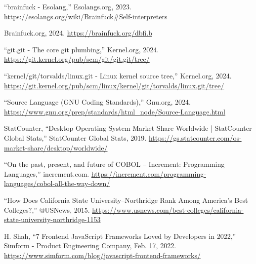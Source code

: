 \documentclass[12pt]{report} %
\begin{document}
\begin{singlespace}
\begin{thebibliography}{}
             “brainfuck - Esolang,” Esolangs.org, 2023. \href{https://esolangs.org/wiki/Brainfuck#Self-interpreters}{https://esolangs.org/wiki/Brainfuck\#Self-interpreters}
            
             Brainfuck.org, 2024. \href{https://brainfuck.org/dbfi.b}{https://brainfuck.org/dbfi.b}
            
             “git.git - The core git plumbing,” Kernel.org, 2024. \href{https://git.kernel.org/pub/scm/git/git.git/tree/}{https://git.kernel.org/pub/scm/git/git.git/tree/}

             “kernel/git/torvalds/linux.git - Linux kernel source tree,” Kernel.org, 2024. \href{https://git.kernel.org/pub/scm/linux/kernel/git/torvalds/linux.git/tree/}{https://git.kernel.org/pub/scm/linux/kernel/git/torvalds/linux.git/tree/}

              “Source Language (GNU Coding Standards),” Gnu.org, 2024. \href{https://www.gnu.org/prep/standards/html_node/Source-Language.html}{https://www.gnu.org/prep/standards/html\_node/Source-Language.html}
            
             StatCounter, “Desktop Operating System Market Share Worldwide | StatCounter Global Stats,” StatCounter Global Stats, 2019. \href{https://gs.statcounter.com/os-market-share/desktop/worldwide/}{https://gs.statcounter.com/os-market-share/desktop/worldwide/}
            
             “On the past, present, and future of COBOL – Increment: Programming Languages,” increment.com. \href{https://increment.com/programming-languages/cobol-all-the-way-down/}{https://increment.com/programming-languages/cobol-all-the-way-down/}

             “How Does California State University--Northridge Rank Among America’s Best Colleges?,” @USNews, 2015. \href{https://www.usnews.com/best-colleges/california-state-university-northridge-1153}{https://www.usnews.com/best-colleges/california-state-university-northridge-1153}

             H. Shah, “7 Frontend JavaScript Frameworks Loved by Developers in 2022,” Simform - Product Engineering Company, Feb. 17, 2022. \href{https://www.simform.com/blog/javascript-frontend-frameworks/}{https://www.simform.com/blog/javascript-frontend-frameworks/}


\end{thebibliography}
\end{singlespace}
\end{document}
